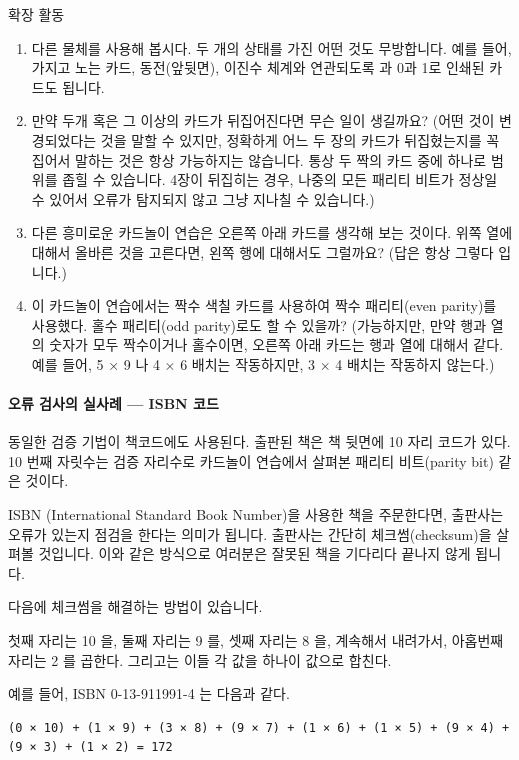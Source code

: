 \documentclass[]{article}
\begin{document}
확장 활동

\begin{enumerate}
\itemsep1pt\parskip0pt
\item
  다른 물체를 사용해 봅시다. 두 개의 상태를 가진 어떤 것도 무방합니다.
  예를 들어, 가지고 노는 카드, 동전(앞뒷면), 이진수 체계와 연관되도록 과
  0과 1로 인쇄된 카드도 됩니다.
\item
  만약 두개 혹은 그 이상의 카드가 뒤집어진다면 무슨 일이 생길까요? (어떤
  것이 변경되었다는 것을 말할 수 있지만, 정확하게 어느 두 장의 카드가
  뒤집혔는지를 꼭 집어서 말하는 것은 항상 가능하지는 않습니다. 통상 두
  짝의 카드 중에 하나로 범위를 좁힐 수 있습니다. 4장이 뒤집히는 경우,
  나중의 모든 패리티 비트가 정상일 수 있어서 오류가 탐지되지 않고 그냥
  지나칠 수 있습니다.)
\item
  다른 흥미로운 카드놀이 연습은 오른쪽 아래 카드를 생각해 보는 것이다.
  위쪽 열에 대해서 올바른 것을 고른다면, 왼쪽 행에 대해서도 그럴까요?
  (답은 항상 그렇다 입니다.)
\item
  이 카드놀이 연습에서는 짝수 색칠 카드를 사용하여 짝수 패리티(even
  parity)를 사용했다. 홀수 패리티(odd parity)로도 할 수 있을까?
  (가능하지만, 만약 행과 열의 숫자가 모두 짝수이거나 홀수이면, 오른쪽
  아래 카드는 행과 열에 대해서 같다. 예를 들어, 5 × 9 나 4 × 6 배치는
  작동하지만, 3 × 4 배치는 작동하지 않는다.)
\end{enumerate}

\mbox{}\paragraph{오류 검사의 실사례 --- ISBN 코드}\label{mdash--isbn-}

동일한 검증 기법이 책코드에도 사용된다. 출판된 책은 책 뒷면에 10 자리
코드가 있다. 10 번째 자릿수는 검증 자리수로 카드놀이 연습에서 살펴본
패리티 비트(parity bit) 같은 것이다.

ISBN (International Standard Book Number)을 사용한 책을 주문한다면,
출판사는 오류가 있는지 점검을 한다는 의미가 됩니다. 출판사는 간단히
체크썸(checksum)을 살펴볼 것입니다. 이와 같은 방식으로 여러분은 잘못된
책을 기다리다 끝나지 않게 됩니다.

다음에 체크썸을 해결하는 방법이 있습니다.

첫째 자리는 10 을, 둘째 자리는 9 를, 셋째 자리는 8 을, 계속해서
내려가서, 아홉번째 자리는 2 를 곱한다. 그리고는 이들 각 값을 하나이
값으로 합친다.

예를 들어, ISBN 0-13-911991-4 는 다음과 같다.

\begin{verbatim}
(0 × 10) + (1 × 9) + (3 × 8) + (9 × 7) + (1 × 6) + (1 × 5) + (9 × 4) + (9 × 3) + (1 × 2) = 172
\end{verbatim}
\end{document}
